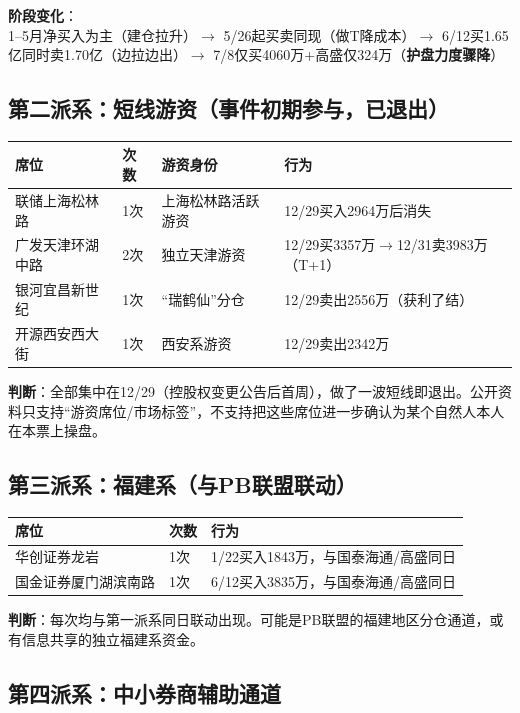 \documentclass[a4paper,11pt,fontset=none]{ctexart}
\begin{document}
\textbf{阶段变化}：\\
1--5月净买入为主（建仓拉升）$\to$ 5/26起买卖同现（做T降成本）$\to$ 6/12买1.65亿同时卖1.70亿（边拉边出）$\to$ 7/8仅买4060万+高盛仅324万（\textbf{护盘力度骤降}）

\subsection*{第二派系：短线游资（事件初期参与，已退出）}

\begin{tabularx}{\textwidth}{L{3.5cm}L{1.5cm}L{2.5cm}X}
\toprule
\textbf{席位} & \textbf{次数} & \textbf{游资身份} & \textbf{行为} \\
\midrule
联储上海松林路 & 1次 & 上海松林路活跃游资 & 12/29买入2964万后消失 \\
广发天津环湖中路 & 2次 & 独立天津游资 & 12/29买3357万$\to$12/31卖3983万（T+1） \\
银河宜昌新世纪 & 1次 & ``瑞鹤仙''分仓 & 12/29卖出2556万（获利了结） \\
开源西安西大街 & 1次 & 西安系游资 & 12/29卖出2342万 \\
\bottomrule
\end{tabularx}

\textbf{判断}：全部集中在12/29（控股权变更公告后首周），做了一波短线即退出。公开资料只支持“游资席位/市场标签”，不支持把这些席位进一步确认为某个自然人本人在本票上操盘。

\subsection*{第三派系：福建系（与PB联盟联动）}

\begin{tabularx}{\textwidth}{L{3.5cm}L{1.5cm}X}
\toprule
\textbf{席位} & \textbf{次数} & \textbf{行为} \\
\midrule
华创证券龙岩 & 1次 & 1/22买入1843万，与国泰海通/高盛同日 \\
国金证券厦门湖滨南路 & 1次 & 6/12买入3835万，与国泰海通/高盛同日 \\
\bottomrule
\end{tabularx}

\textbf{判断}：每次均与第一派系同日联动出现。可能是PB联盟的福建地区分仓通道，或有信息共享的独立福建系资金。

\subsection*{第四派系：中小券商辅助通道}
\end{document}
